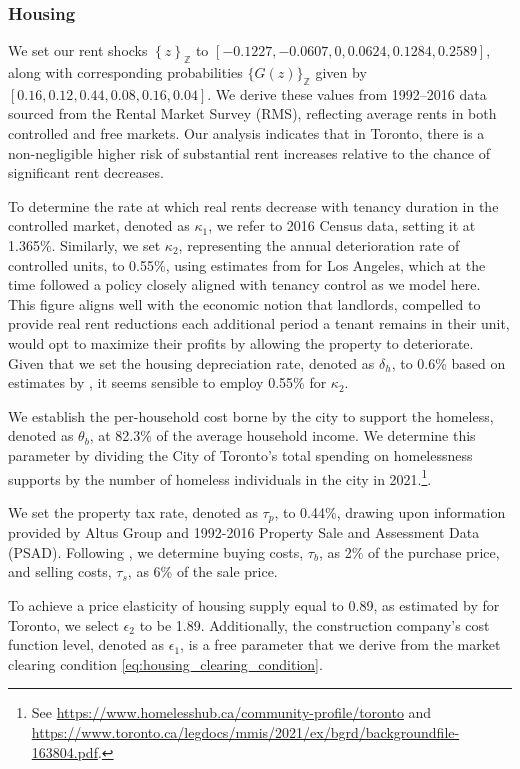 \documentclass[parskip=full]{article}
\begin{document}
\subsubsection{Housing}

We set our rent shocks $\left\{z\right\}_{\mathbb{Z}}$ to $\left[-0.1227,-0.0607,0,0.0624,0.1284,0.2589\right]$, along with corresponding probabilities $\{G(z)\}_{\mathbb{Z}}$ given by $\left[0.16,0.12,0.44,0.08,0.16,0.04\right]$. We derive these values from 1992–2016 data sourced from the Rental Market Survey (RMS), reflecting average rents in both controlled and free markets. Our analysis indicates that in Toronto, there is a non-negligible higher risk of substantial rent increases relative to the chance of significant rent decreases.

To determine the rate at which real rents decrease with tenancy duration in the controlled market, denoted as $\kappa_{1}$, we refer to 2016 Census data, setting it at 1.365\%. Similarly, we set $\kappa_{2}$, representing the annual deterioration rate of controlled units, to 0.55\%, using estimates from \citet{murray_et_al-1991} for Los Angeles, which at the time followed a policy closely aligned with tenancy control as we model here. This figure aligns well with the economic notion that landlords, compelled to provide real rent reductions each additional period a tenant remains in their unit, would opt to maximize their profits by allowing the property to deteriorate. Given that we set the housing depreciation rate, denoted as $\delta_{h}$, to 0.6\% based on estimates by \citet{rosenthal-2014}, it seems sensible to employ 0.55\% for $\kappa_{2}$.

We establish the per-household cost borne by the city to support the homeless, denoted as $\theta_{b}$, at 82.3\% of the average household income. We determine this parameter by dividing the City of Toronto's total spending on homelessness supports by the number of homeless individuals in the city in 2021.\footnote{See \url{https://www.homelesshub.ca/community-profile/toronto} and \url{https://www.toronto.ca/legdocs/mmis/2021/ex/bgrd/backgroundfile-163804.pdf}.}.

We set the property tax rate, denoted as $\tau_p$, to 0.44\%, drawing upon information provided by Altus Group and 1992-2016 Property Sale and Assessment Data (PSAD). Following \citet{gm-2003}, we determine buying costs, $\tau_{b}$, as 2\% of the purchase price, and selling costs, $\tau_{s}$, as 6\% of the sale price.

To achieve a price elasticity of housing supply equal to 0.89, as estimated by \citet{piaxao-2021} for Toronto, we select $\epsilon_{2}$ to be 1.89. Additionally, the construction company's cost function level, denoted as $\epsilon_1$, is a free parameter that we derive from the market clearing condition \eqref{eq:housing_clearing_condition}.
\end{document}
